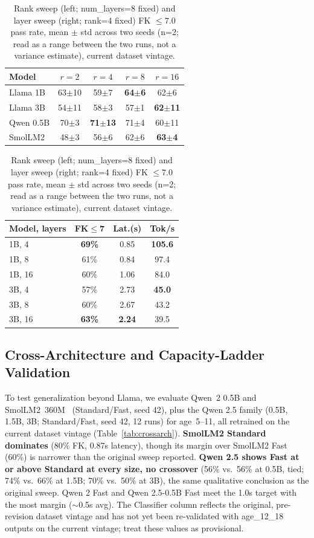 \documentclass[pdflatex,sn-mathphys-num]{sn-jnl}%
\begin{document}
\begin{table}[!h]
  \centering
  \caption{Rank sweep (left; num\_layers=8 fixed) and layer sweep (right; rank=4 fixed) FK $\leq 7.0$ pass rate, mean $\pm$ std across two seeds (n=2; read as a range between the two runs, not a variance estimate), current dataset vintage.}
  \label{tab:sweeps}
  \scriptsize
  \setlength{\tabcolsep}{3pt}
  \begin{tabular}{@{}lcccc@{}}
    \toprule
    Model     & $r{=}2$ & $r{=}4$ & $r{=}8$ & $r{=}16$ \\
    \midrule
    Llama 1B  & 63$\pm$10 & 59$\pm$7 & \textbf{64$\pm$6} & 62$\pm$6 \\
    Llama 3B  & 54$\pm$11 & 58$\pm$3 & 57$\pm$1 & \textbf{62$\pm$11} \\
    Qwen 0.5B & 70$\pm$3 & \textbf{71$\pm$13} & 71$\pm$4 & 60$\pm$11 \\
    SmolLM2   & 48$\pm$3 & 56$\pm$6 & 62$\pm$6 & \textbf{63$\pm$4} \\
    \bottomrule
  \end{tabular}
  \qquad
  \begin{tabular}{@{}lccc@{}}
    \toprule
    Model, layers & FK$\leq$7 & Lat.(s) & Tok/s \\
    \midrule
    1B, 4  & \textbf{69\%} & 0.85 & \textbf{105.6} \\
    1B, 8  & 61\% & 0.84 & 97.4 \\
    1B, 16 & 60\% & 1.06 & 84.0 \\
    3B, 4  & 57\% & 2.73 & \textbf{45.0} \\
    3B, 8  & 60\% & 2.67 & 43.2 \\
    3B, 16 & \textbf{63\%} & \textbf{2.24} & 39.5 \\
    \bottomrule
  \end{tabular}
\end{table}

\subsection{Cross-Architecture and Capacity-Ladder Validation}\label{sec:crossarch}

To test generalization beyond Llama, we evaluate Qwen~2 0.5B and SmolLM2~360M~\cite{allal2025smollm2} (Standard/Fast, seed 42), plus the Qwen 2.5 family (0.5B, 1.5B, 3B; Standard/Fast, seed 42, 12 runs) for age~5--11, all retrained on the current dataset vintage (Table~\ref{tab:crossarch}). \textbf{SmolLM2 Standard dominates} (80\% FK, 0.87s latency), though its margin over SmolLM2 Fast (60\%) is narrower than the original sweep reported. \textbf{Qwen 2.5 shows Fast at or above Standard at every size, no crossover} (56\% vs.\ 56\% at 0.5B, tied; 74\% vs.\ 66\% at 1.5B; 70\% vs.\ 50\% at 3B), the same qualitative conclusion as the original sweep. Qwen 2 Fast and Qwen 2.5-0.5B Fast meet the 1.0s target with the most margin ($\sim$0.5s avg). The Classifier column reflects the original, pre-revision dataset vintage and has not yet been re-validated with age\_12\_18 outputs on the current vintage; treat these values as provisional.
\end{document}
